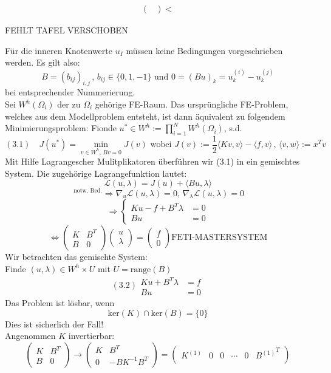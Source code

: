 \begin{enumerate}
\begin{align}
\begin{pmatrix}
  \end{pmatrix}<
  \label{}
\end{align}

FEHLT TAFEL VERSCHOBEN


Für die inneren Knotenwerte $u_I$ müssen keine Bedingungen vorgeschrieben werden. Es gilt also:
\[ B=(b_{ij})_{i,j}\, , \, b_{ij}\in \{ 0,1,-1 \} \text{ und } 0 = (Bu)_k=u^{(i)}_k - u^{(j)}_k \]
bei entsprechender Nummerierung.\\
Sei $W^h(\Omega_i)$ der zu $\Omega_i$ gehörige FE-Raum. Das ursprüngliche FE-Problem, welches aus dem Modellproblem entsteht, ist dann äquivalent zu folgendem Minimierungsproblem:
Fionde $u^* \in W^h := \prod_{i=1}^N W^h (\Omega_i)$, s.d.
\[(3.1) \quad J(u^*) = \min_{v \in W^h, \, Bv=0} J(v) \text{ wobei } J(v):=\frac{1}{2} \langle Kv,v\rangle - \langle f,v \rangle\, , \, \langle v , w \rangle := x^Tv \]
Mit Hilfe Lagrangescher Mulitplikatoren überführen wir (3.1) in ein gemischtes System. Die zugehörige Lagrangefunktion lautet:
\[ \mathcal{L}(u,\lambda)=J(u)+\langle Bu,\lambda \rangle \]
\[^{\text{ notw. Bed.}}\Rightarrow \nabla_u \mathcal{L} (u,\lambda)=0,\, \nabla_\lambda \mathcal{L} (u,\lambda)=0  \]
\[\Rightarrow \begin{cases} Ku-f+B^T\lambda &=0 \\ Bu &= 0 \end{cases} \]
\[ \Leftrightarrow \begin{pmatrix} K & B^T \\ B & 0 \end{pmatrix} \begin{pmatrix}u \\ \lambda \end{pmatrix} = \begin{pmatrix} f \\ 0 \end{pmatrix}  \boxed{\text{FETI-MASTERSYSTEM}} \]
Wir betrachten das gemischte System:\\
Finde $(u,\lambda) \in W^h \times U $ mit $U=\text{range}(B)$
\begin{equation}
(3.2) \begin{aligned}Ku+B^T\lambda &= f \\ Bu &= 0 \end{aligned}
\end{equation}
Das Problem ist lösbar, wenn
\[ \text{ker}(K)\cap \text{ker}(B) = \{ 0 \} \]
Dies ist sicherlich der Fall!\\
Angenommen $K$ invertierbar:
\[ \begin{pmatrix} K & B^T \\ B & 0 \end{pmatrix} \rightarrow  \begin{pmatrix} K & B^T \\ 0 & -BK^{-1}B^T \end{pmatrix} = \begin{pmatrix}   K^{(1)} & 0 & 0 & \cdots & 0 & {B^{(1)}}^T \\

\end{pmatrix}\]
\end{enumerate}

